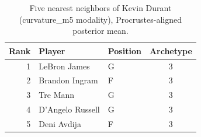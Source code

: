 \begin{table}[htbp]
  \centering\small
  \begin{tabular}{rllc}
    \toprule
    Rank & Player & Position & Archetype \\
    \midrule
    1 & LeBron James & G & 3 \\
    2 & Brandon Ingram & F & 3 \\
    3 & Tre Mann & G & 3 \\
    4 & D'Angelo Russell & G & 3 \\
    5 & Deni Avdija & F & 3 \\
    \bottomrule
  \end{tabular}
  \caption{Five nearest neighbors of Kevin Durant (curvature_m5 modality), Procrustes-aligned posterior mean.}
  \label{tab:Kevin_Durant_neighbors_curvature_m5}
\end{table}


